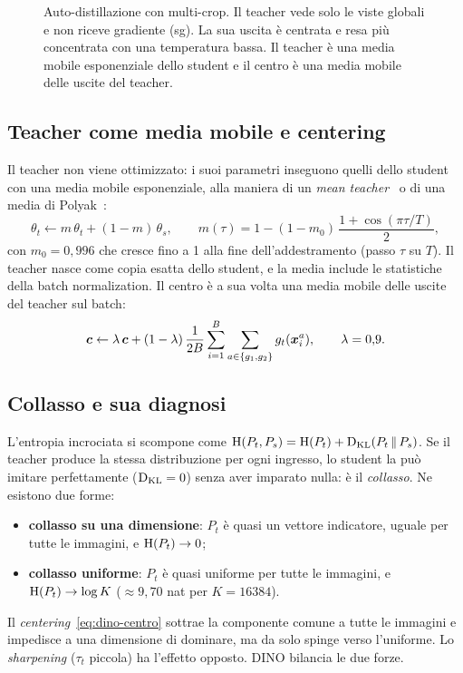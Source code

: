 \begin{figure}[t]
  \centering
  \resizebox{\linewidth}{!}{}
  \caption[Auto-distillazione DINO]{Auto-distillazione con multi-crop. Il teacher vede solo le
    viste globali e non riceve gradiente (sg). La sua uscita è centrata e resa più concentrata
    con una temperatura bassa. Il teacher è una media mobile esponenziale dello student e il
    centro è una media mobile delle uscite del teacher.}
  \label{fig:dino}
\end{figure}

\subsection{Teacher come media mobile e centering}

Il teacher non viene ottimizzato: i suoi parametri inseguono quelli dello student con una media
mobile esponenziale, alla maniera di un \emph{mean teacher}~\cite{tarvainen2017meanteacher} o di
una media di Polyak~\cite{polyak1992averaging}:
\begin{equation}
  \theta_t\leftarrow m\,\theta_t+(1-m)\,\theta_s,\qquad
  m(\tau)=1-(1-m_0)\,\frac{1+\cos(\pi\tau/T)}{2},
  \label{eq:dino-ema}
\end{equation}
con $m_0=0{,}996$ che cresce fino a 1 alla fine dell'addestramento (passo $\tau$ su $T$). Il
teacher nasce come copia esatta dello student, e la media include le statistiche della batch
normalization. Il centro è a sua volta una media mobile delle uscite del teacher sul batch:
\begin{equation}
  \bm{c}\leftarrow\lambda\,\bm{c}+(1-\lambda)\,\frac{1}{2B}\sum_{i=1}^{B}\sum_{a\in\{g_1,g_2\}}g_t(\bm{x}_i^{a}),
  \qquad\lambda=0{,}9 .
  \label{eq:dino-centro}
\end{equation}

\subsection{Collasso e sua diagnosi}
\label{sec:collasso}

L'entropia incrociata si scompone come
$\mathrm{H}(P_t,P_s)=\mathrm{H}(P_t)+\operatorname{D_{KL}}(P_t\,\Vert\,P_s)$. Se il teacher produce la stessa distribuzione
per ogni ingresso, lo student la può imitare perfettamente ($\operatorname{D_{KL}}=0$) senza aver imparato nulla:
è il \emph{collasso}. Ne esistono due forme:
\begin{itemize}
  \item \textbf{collasso su una dimensione}: $P_t$ è quasi un vettore indicatore, uguale per
  tutte le immagini, e $\mathrm{H}(P_t)\to0$;
  \item \textbf{collasso uniforme}: $P_t$ è quasi uniforme per tutte le immagini, e
  $\mathrm{H}(P_t)\to\log K$ ($\approx9{,}70$ nat per $K=\num{16384}$).
\end{itemize}
Il \emph{centering}~\eqref{eq:dino-centro} sottrae la componente comune a tutte le immagini e
impedisce a una dimensione di dominare, ma da solo spinge verso l'uniforme. Lo
\emph{sharpening} ($\tau_t$ piccola) ha l'effetto opposto. DINO bilancia le due forze.

